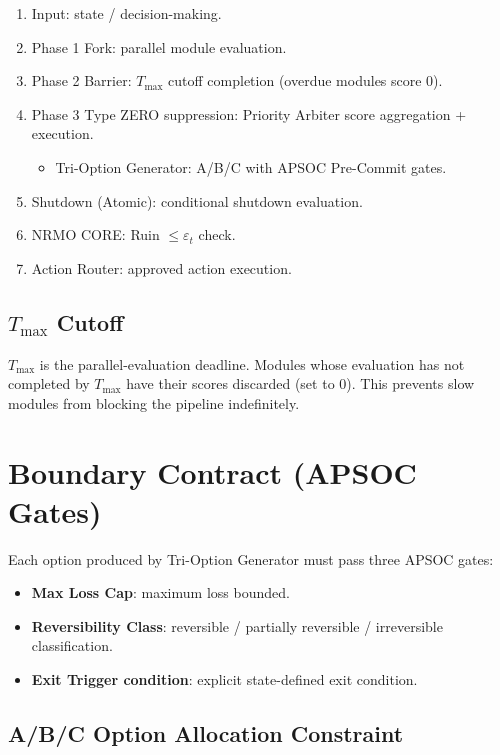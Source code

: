 \begin{enumerate}
\item Input: state / decision-making.
\item Phase 1 Fork: parallel module evaluation.
\item Phase 2 Barrier: $T_{\max}$ cutoff completion (overdue
modules score 0).
\item Phase 3 Type ZERO suppression: Priority Arbiter score
aggregation + execution.
\begin{itemize}
\item Tri-Option Generator: A/B/C with APSOC Pre-Commit gates.
\end{itemize}
\item Shutdown (Atomic): conditional shutdown evaluation.
\item NRMO CORE: Ruin $\le \varepsilon_t$ check.
\item Action Router: approved action execution.
\end{enumerate}

\subsection{$T_{\max}$ Cutoff}

$T_{\max}$ is the parallel-evaluation deadline. Modules whose
evaluation has not completed by $T_{\max}$ have their scores
discarded (set to 0). This prevents slow modules from blocking the
pipeline indefinitely.

\section{Boundary Contract (APSOC Gates)}
\label{sec:r1fix-boundary-contract}

Each option produced by Tri-Option Generator must pass three APSOC
gates:

\begin{itemize}
\item \textbf{Max Loss Cap}: maximum loss bounded.
\item \textbf{Reversibility Class}: reversible / partially
reversible / irreversible classification.
\item \textbf{Exit Trigger condition}: explicit state-defined exit
condition.
\end{itemize}

\subsection{A/B/C Option Allocation Constraint}

